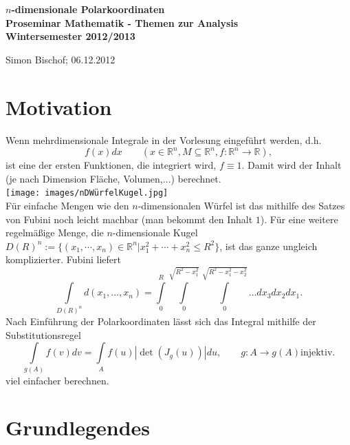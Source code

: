\documentclass[a4paper,11pt]{scrartcl}
\newcommand{\R}{{\ensuremath{\mathbb{R}}}}
\newcommand{\const}{\ensuremath{\equiv}}
\begin{document}
\begin{titlepage}
	\begin{center}	
		\LARGE \textbf{$n$-dimensionale Polarkoordinaten \\[5ex]
			{\Large Proseminar Mathematik - Themen zur Analysis \\[5ex] 
    		Wintersemester 2012/2013}\\[5ex]}
	\end{center}
	\begin{center}
		Simon Bischof; 06.12.2012
	\end{center}
\end{titlepage}
\clearpage{}
\setcounter{tocdepth}{1}

\clearpage{}
\section{Motivation}
Wenn mehrdimensionale Integrale in der Vorlesung eingeführt werden, d.h.
\begin{equation}
f(x)dx \qquad (x\in\R^n,M\subseteq \R^n, f:\R^n\to\R),\end{equation}
ist eine der ersten Funktionen, die integriert wird, $f\const 1$. Damit wird der Inhalt (je nach Dimension Fläche, Volumen,$\ldots$) berechnet.\\
\texttt{[image: images/nDWürfelKugel.jpg]}\\
Für einfache Mengen wie den $n$-dimensionalen Würfel ist das mithilfe des Satzes von Fubini noch leicht machbar (man bekommt den Inhalt $1$). Für eine weitere regelmäßige Menge, die $n$-dimensionale Kugel $D(R)^n:=\{(x_1,\cdots,x_n)\in\R^n|x_1^2+\cdots+x_n^2\leq R^2\}$, ist das ganze ungleich komplizierter. Fubini liefert
$$\int\limits_{D(R)^n} d(x_1,\ldots,x_n)= \int\limits_0^R\int\limits_0^{\sqrt{R^2-x_1^2}}\int\limits_0^{\sqrt{R^2-x_1^2-x_2^2}}\ldots dx_3 dx_2 dx_1.$$
Nach Einführung der Polarkoordinaten lässt sich das Integral mithilfe der Substitutionsregel
\begin{equation}
\label{subst}
\int\limits_{g(A)}f(v)dv=\int\limits_A f(u)|\det(J_g(u))| du, \qquad g:A\to g(A) \text{injektiv.}
\end{equation}
viel einfacher berechnen.
\section{Grundlegendes}
\end{document}
